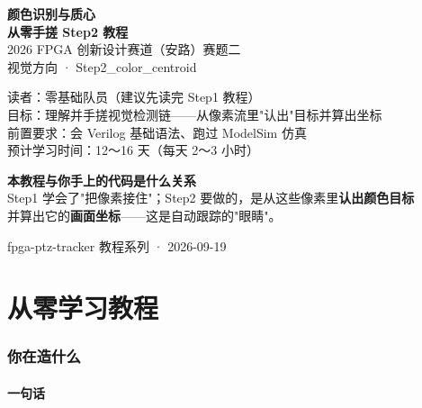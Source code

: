 \documentclass[11pt]{ctexart}
\begin{document}
\begin{titlepage}
\centering
\vspace*{2.2cm}
{\color{deep}\Huge\bfseries 颜色识别与质心}\\[6pt]
{\color{deep}\Large\bfseries 从零手搓 Step2 教程}\\[14pt]
{\large 2026 FPGA 创新设计赛道（安路）赛题二}\\[6pt]
{\large 视觉方向 · Step2\_color\_centroid}\\[20pt]

\begin{tcolorbox}[enhanced, colback=codebg, colframe=accent, boxrule=0.8pt,
  arc=2mm, width=12.5cm, left=4mm, right=4mm, top=3mm, bottom=3mm]
\centering
{\small 读者：零基础队员（建议先读完 Step1 教程）\\
目标：理解并手搓视觉检测链——从像素流里"认出"目标并算出坐标\\
前置要求：会 Verilog 基础语法、跑过 ModelSim 仿真\\
预计学习时间：12～16 天（每天 2～3 小时）}
\end{tcolorbox}

\vspace{8mm}
\begin{tcolorbox}[enhanced, colback=tipbg, colframe=tipline, boxrule=0.5pt,
  arc=2mm, width=12.5cm, left=4mm, right=4mm, top=2mm, bottom=2mm]
\centering
{\small\color{deep} \textbf{本教程与你手上的代码是什么关系}\\
Step1 学会了"把像素接住"；Step2 要做的，是从这些像素里\textbf{认出颜色目标}\\
并算出它的\textbf{画面坐标}——这是自动跟踪的"眼睛"。}
\end{tcolorbox}

\vfill
{\small\color{black!50} fpga-ptz-tracker 教程系列 · 2026-09-19}
\end{titlepage}

\tableofcontents
\newpage

\part{从零学习教程}

\section{你在造什么}

\subsection{一句话}
\end{document}
